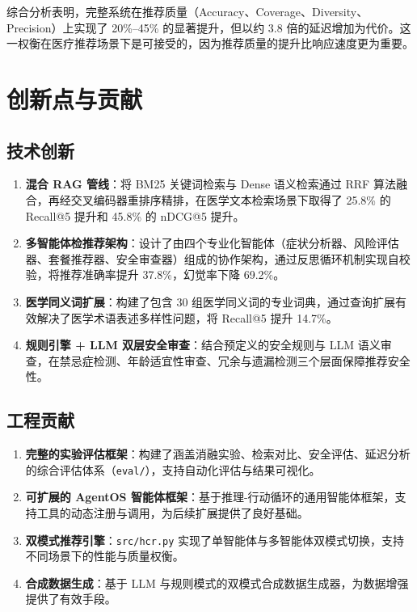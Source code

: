 \documentclass[12pt,a4paper]{article}
\begin{document}
综合分析表明，完整系统在推荐质量（Accuracy、Coverage、Diversity、Precision）上实现了 20\%--45\% 的显著提升，但以约 3.8 倍的延迟增加为代价。这一权衡在医疗推荐场景下是可接受的，因为推荐质量的提升比响应速度更为重要。

\section{创新点与贡献}
\label{sec:innovation}

\subsection{技术创新}

\begin{enumerate}[leftmargin=2em]
    \item \textbf{混合 RAG 管线}：将 BM25 关键词检索与 Dense 语义检索通过 RRF 算法融合，再经交叉编码器重排序精排，在医学文本检索场景下取得了 25.8\% 的 Recall@5 提升和 45.8\% 的 nDCG@5 提升。
    \item \textbf{多智能体检推荐架构}：设计了由四个专业化智能体（症状分析器、风险评估器、套餐推荐器、安全审查器）组成的协作架构，通过反思循环机制实现自校验，将推荐准确率提升 37.8\%，幻觉率下降 69.2\%。
    \item \textbf{医学同义词扩展}：构建了包含 30 组医学同义词的专业词典，通过查询扩展有效解决了医学术语表述多样性问题，将 Recall@5 提升 14.7\%。
    \item \textbf{规则引擎 + LLM 双层安全审查}：结合预定义的安全规则与 LLM 语义审查，在禁忌症检测、年龄适宜性审查、冗余与遗漏检测三个层面保障推荐安全性。
\end{enumerate}

\subsection{工程贡献}

\begin{enumerate}[leftmargin=2em]
    \item \textbf{完整的实验评估框架}：构建了涵盖消融实验、检索对比、安全评估、延迟分析的综合评估体系（\texttt{eval/}），支持自动化评估与结果可视化。
    \item \textbf{可扩展的 AgentOS 智能体框架}：基于推理-行动循环的通用智能体框架，支持工具的动态注册与调用，为后续扩展提供了良好基础。
    \item \textbf{双模式推荐引擎}：\texttt{src/hcr.py} 实现了单智能体与多智能体双模式切换，支持不同场景下的性能与质量权衡。
    \item \textbf{合成数据生成}：基于 LLM 与规则模式的双模式合成数据生成器，为数据增强提供了有效手段。
\end{enumerate}
\end{document}
